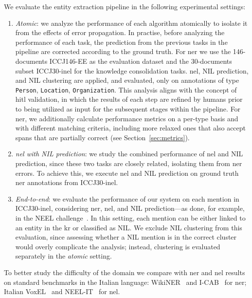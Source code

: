 We evaluate the entity extraction pipeline in the following experimental settings:
\begin{enumerate}
    \item \textit{Atomic}: we analyze the performance of each algorithm atomically to isolate it from the effects of error propagation. In practise, before analyzing the performance of each task, the prediction from the previous tasks in the pipeline are corrected according to the ground truth. For \ac{ner} we use the 146-documents ICCJ146-EE as the evaluation dataset and the 30-documents subset ICCJ30-\ac{inel} for the knowledge consolidation tasks. \ac{nel}, NIL prediction, and NIL clustering are applied, and evaluated, only on annotations of type \texttt{Person}, \texttt{Location}, \texttt{Organization}. This analysis aligns with the concept of \acf{hitl} validation, in which the results of each step are refined by humans prior to being utilized as input for the subsequent stages within the pipeline. For \ac{ner}, we additionally calculate performance metrics on a per-type basis and with different matching criteria, including more relaxed ones that also accept spans that are partially correct (see Section~\ref{sec:metrics}).  
    \item \textit{\ac{nel} with NIL prediction}: we study the combined performance of \ac{nel} and NIL prediction, since these two tasks are closely related, isolating them from \ac{ner} errors. To achieve this, we execute \ac{nel} and NIL prediction on ground truth \ac{ner} annotations from ICCJ30-\ac{inel}.
    \item \textit{End-to-end}: we evaluate the performance of our system on each mention in ICCJ30-\ac{inel}, considering \ac{ner}, \ac{nel}, and NIL prediction---as done, for example, in the NEEL challenge~\cite{basile2016neelit}. In this setting, each mention can be either linked to an entity in the \ac{kr} or classified as NIL. We exclude NIL clustering from this evaluation, since assessing whether a NIL mention is in the correct cluster would overly complicate the analysis; instead, clustering is evaluated separately in the \textit{atomic} setting.


\end{enumerate}
To better study the difficulty of the domain we compare with \ac{ner} and \ac{nel} results on standard benchmarks in the Italian language: WikiNER~\cite{NOTHMAN2013151} and I-CAB~\cite{magnini-etal-2006-cab} for \ac{ner}; Italian VoxEL~\cite{rosales2018voxel} and NEEL-IT~\cite{basile2016neelit} for \ac{nel}.

